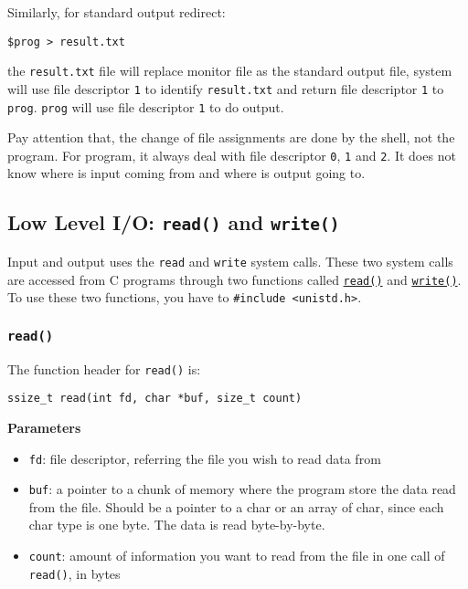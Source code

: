 \documentclass[11pt]{article}
\begin{document}
Similarly, for standard output redirect:
\begin{Verbatim}[frame=single]
$prog > result.txt
\end{Verbatim}
the \texttt{result.txt} file will replace monitor file as the standard output file, system will use file descriptor \texttt{1} to identify \texttt{result.txt} and return file descriptor \texttt{1} to \texttt{prog}. \texttt{prog} will use file descriptor \texttt{1} to do output.

Pay attention that, the change of file assignments are done by the shell, not the program. For program, it always deal with file descriptor \texttt{0}, \texttt{1} and \texttt{2}. It does not know where is input coming from and where is output going to.
\subsection{Low Level I/O: \texttt{read()} and \texttt{write()}}
\label{sec:orgf0cefd5}
Input and output uses the \texttt{read} and \texttt{write} system calls. These two system calls are accessed from C programs through two functions called \href{http://man7.org/linux/man-pages/man2/read.2.html}{\texttt{read()}} and \href{http://man7.org/linux/man-pages/man2/write.2.html}{\texttt{write()}}. To use these two functions, you have to \texttt{\#include <unistd.h>}.
\subsubsection{\texttt{read()}}
\label{sec:org721131d}
The function header for \texttt{read()} is:
\begin{verbatim}
ssize_t read(int fd, char *buf, size_t count)
\end{verbatim}
\textbf{Parameters}

\begin{itemize}
\item \texttt{fd}: file descriptor, referring the file you wish to read data from
\item \texttt{buf}: a pointer to a chunk of memory where the program store the data read from the file. Should be a pointer to a char or an array of char, since each char type is one byte. The data is read byte-by-byte.
\item \texttt{count}: amount of information you want to read from the file in one call of \texttt{read()}, in bytes
\end{itemize}
\end{document}
